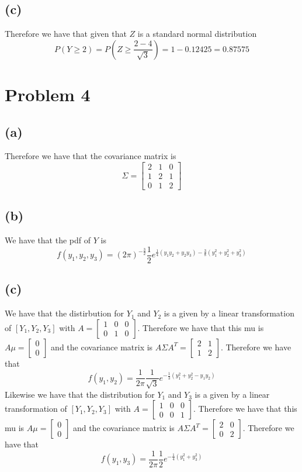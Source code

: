 \subsection*{(c)}
Therefore we have that given that $Z$ is a standard normal distribution
$$P(Y\geq 2)=P(Z\geq \frac{2-4}{\sqrt{3}})=1-0.12425=\boxed{0.87575}$$
\section*{Problem 4}
\subsection*{(a)}
Therefore we have that the covariance matrix is 
$$\Sigma=\begin{bmatrix}
2&1&0\\
1&2&1\\
0&1&2
\end{bmatrix}$$
\subsection*{(b)}
We have that the pdf of $Y$ is
$$f(y_1,y_2,y_3)=(2\pi)^{-\frac{3}{2}}\frac{1}{2}e^{\frac{1}{4}(y_1y_2+y_2y_3)
-\frac{3}{8}(y_1^2+y_2^2+y_3^2)}$$
\subsection*{(c)}
We have that the distirbution for $Y_1$ and $Y_2$ is a 
given by a linear transformation of $[Y_1,Y_2,Y_3]$ with 
$A=\begin{bmatrix}1&0&0\\0&1&0\end{bmatrix}$. Therefore we have 
that this mu is $A\mu=\begin{bmatrix}0\\0\end{bmatrix}$ and
the covariance matrix is $A\Sigma A^T=\begin{bmatrix}2&1\\1&2\end{bmatrix}$.
Therefore we have that 
$$f(y_1,y_2)=\frac{1}{2\pi}\frac{1}{\sqrt{3}}e^{-\frac{1}{3}(y_1^2+y_2^2-y_1y_2)}$$
Likewise we have that the distribution for $Y_1$ and $Y_3$ is a
given by a linear transformation of $[Y_1,Y_2,Y_3]$ with
$A=\begin{bmatrix}1&0&0\\0&0&1\end{bmatrix}$. Therefore we have
that this mu is $A\mu=\begin{bmatrix}0\\0\end{bmatrix}$ and
the covariance matrix is $A\Sigma A^T=\begin{bmatrix}2&0\\0&2\end{bmatrix}$.
Therefore we have that
$$f(y_1,y_3)=\frac{1}{2\pi}\frac{1}{2}e^{-\frac{1}{4}(y_1^2+y_3^2)}$$
